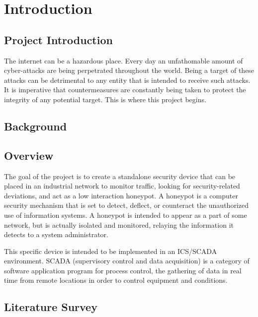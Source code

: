 \chapter{Introduction}

\section{Project Introduction}

The internet can be a hazardous place. Every day an unfathomable amount of cyber-attacks are being perpetrated throughout the world. Being a target of these attacks can be detrimental to any entity that is intended to receive such attacks. It is imperative that countermeasures are constantly being taken to protect the integrity of any potential target. This is where this project begins.

\section{Background}

\section{Overview}
The goal of the project is to create a standalone security device that can be placed in an industrial network to monitor traffic, looking for security-related deviations, and act as a low interaction honeypot. A honeypot is a computer security mechanism that is set to detect, deflect, or counteract the unauthorized use of information systems. A honeypot is intended to appear as a part of some network, but is actually isolated and monitored, relaying the information it detects to a system administrator.

This specific device is intended to be implemented in an ICS/SCADA environment. SCADA (supervisory control and data acquisition) is a category of software application program for process control, the gathering of data in real time from remote locations in order to control equipment and conditions.

\section{Literature Survey}
